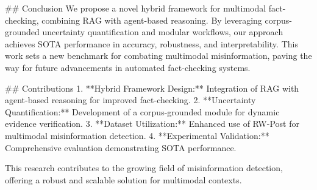 ## Conclusion  
We propose a novel hybrid framework for multimodal fact-checking, combining RAG with agent-based reasoning. By leveraging corpus-grounded uncertainty quantification and modular workflows, our approach achieves SOTA performance in accuracy, robustness, and interpretability. This work sets a new benchmark for combating multimodal misinformation, paving the way for future advancements in automated fact-checking systems.  

## Contributions  
1. **Hybrid Framework Design:** Integration of RAG with agent-based reasoning for improved fact-checking.  
2. **Uncertainty Quantification:** Development of a corpus-grounded module for dynamic evidence verification.  
3. **Dataset Utilization:** Enhanced use of RW-Post for multimodal misinformation detection.  
4. **Experimental Validation:** Comprehensive evaluation demonstrating SOTA performance.  

This research contributes to the growing field of misinformation detection, offering a robust and scalable solution for multimodal contexts.